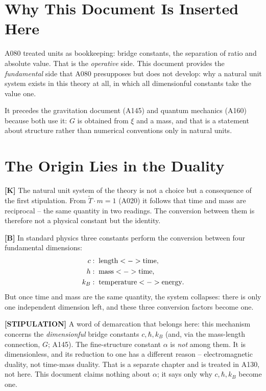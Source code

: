 \section{Why This Document Is Inserted Here}

A080 treated units as bookkeeping: bridge constants, the separation of ratio
and absolute value. That is the \emph{operative} side. This document provides
the \emph{fundamental} side that A080 presupposes but does not develop: why a
natural unit system exists in this theory at all, in which all dimensionful
constants take the value one.

It precedes the gravitation document (A145) and quantum mechanics (A160)
because both use it: $G$ is obtained from $\xi$ and a mass, and that is a
statement about structure rather than numerical conventions only in natural units.

\section{The Origin Lies in the Duality}

\textbf{[K]} The natural unit system of the theory is not a choice but a
consequence of the first stipulation. From $\tilde T\cdot m = 1$ (A020) it
follows that time and mass are reciprocal -- the same quantity in two readings.
The conversion between them is therefore not a physical constant but the
identity.

\textbf{[B]} In standard physics three constants perform the conversion between
four fundamental dimensions:
\begin{align}
  c    &:\;\text{length}      \leftrightarrow\text{time}, \notag\\
  \hbar&:\;\text{mass}        \leftrightarrow\text{time}, \notag\\
  k_B  &:\;\text{temperature} \leftrightarrow\text{energy}. \notag
\end{align}
But once time and mass are the same quantity, the system collapses: there is
only one independent dimension left, and these three conversion factors become
one.

\textbf{[STIPULATION]} A word of demarcation that belongs here: this mechanism
concerns the \emph{dimensionful} bridge constants $c, \hbar, k_B$ (and, via
the mass-length connection, $G$; A145). The fine-structure constant $\alpha$
is \emph{not} among them. It is dimensionless, and its reduction to one has a
different reason -- electromagnetic duality, not time-mass duality. That is a
separate chapter and is treated in A130, not here. This document claims nothing
about $\alpha$; it says only why $c, \hbar, k_B$ become one.

